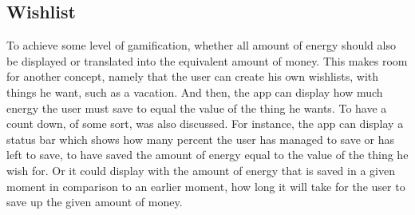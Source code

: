 \subsection{Wishlist}
To achieve some level of gamification, whether all amount of energy should also be displayed or translated into the equivalent amount of money. This makes room for another concept, namely that the user can create his own wishlists, with things he want, such as a vacation. And then, the app can display how much energy the user must save to equal the value of the thing he wants. To have a count down, of some sort, was also discussed. For instance, the app can display a status bar which shows how many percent the user has managed to save or has left to save, to have saved the amount of energy equal to the value of the thing he wish for. Or it could display with the amount of energy that is saved in a given moment in comparison to an earlier moment, how long it will take for the user to save up the given amount of money.  